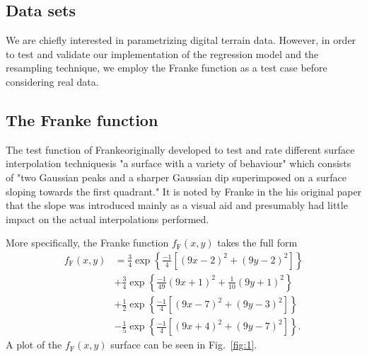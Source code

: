 \documentclass[a4paper]{article}
\newcommand{\fig}[1]{Fig.\ \ref{fig:#1}}
\begin{document}
\begin{multicols}{2}
\section{Data sets}
We are chiefly interested in parametrizing digital terrain data. However, in order to test and validate our implementation of the regression model and the resampling technique, we employ the Franke function\autocite{franke1979critical} as a test case before considering real data.

\subsection{The Franke function \label{sect:franke}}
The test function of Franke\textemdash originally developed to test and rate different surface interpolation techniques\textemdash is "a surface with a variety of behaviour" which consists of "two Gaussian peaks and a sharper Gaussian dip superimposed on a surface sloping towards the first quadrant."\autocite{franke1979critical} It is noted by Franke in the his original paper that the slope was introduced mainly as a visual aid and presumably had little impact on the actual interpolations performed. 

More specifically, the Franke function $f_\text{F}(x,y)$ takes the full form
\begin{align}
f_\text{F}(x,y) &= \frac{3}{4}\exp\left\{\frac{-1}{4}\left[\left(9x-2\right)^2 + \left(9y-2\right)^2\right]\right\}\nonumber \\
&+ \frac{3}{4}\exp\left\{\frac{-1}{49}\left(9x+1\right)^2 + \frac{1}{10}\left(9y+1\right)^2\right\}\nonumber \\
&+ \frac{1}{2}\exp\left\{\frac{-1}{4}\left[\left(9x-7\right)^2 + \left(9y-3\right)^2\right]\right\}\nonumber \\
&- \frac{1}{5}\exp\left\{\frac{-1}{4}\left[\left(9x+4\right)^2 + \left(9y-7\right)^2\right]\right\}.
\end{align}
A plot of the $f_\text{F}(x,y)$ surface can be seen in \fig{1}.


\end{multicols}
\end{document}
